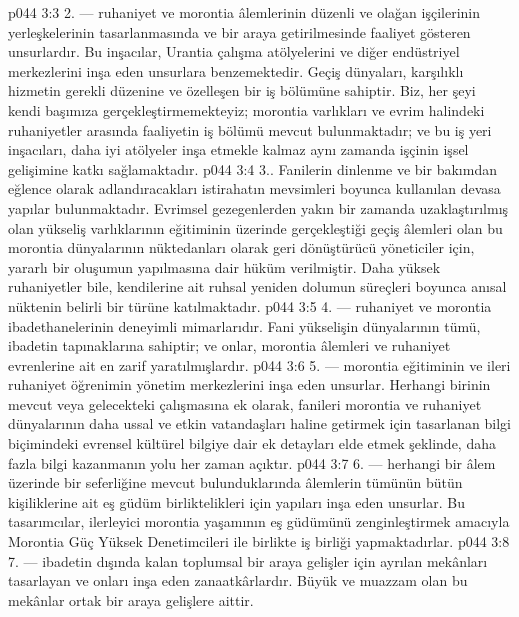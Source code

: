 \vs p044 3:3 2.\bibnobreakspace {} --- ruhaniyet ve morontia âlemlerinin düzenli ve olağan işçilerinin yerleşkelerinin tasarlanmasında ve bir araya getirilmesinde faaliyet gösteren unsurlardır. Bu inşacılar, Urantia çalışma atölyelerini ve diğer endüstriyel merkezlerini inşa eden unsurlara benzemektedir. Geçiş dünyaları, karşılıklı hizmetin gerekli düzenine ve özelleşen bir iş bölümüne sahiptir. Biz, her şeyi kendi başımıza gerçekleştirmemekteyiz; morontia varlıkları ve evrim halindeki ruhaniyetler arasında faaliyetin iş bölümü mevcut bulunmaktadır; ve bu iş yeri inşacıları, daha iyi atölyeler inşa etmekle kalmaz aynı zamanda işçinin işsel gelişimine katkı sağlamaktadır.
\vs p044 3:4 3.\bibnobreakspace {}. Fanilerin dinlenme ve bir bakımdan eğlence olarak adlandıracakları istirahatın mevsimleri boyunca kullanılan devasa yapılar bulunmaktadır. Evrimsel gezegenlerden yakın bir zamanda uzaklaştırılmış olan yükseliş varlıklarının eğitiminin üzerinde gerçekleştiği geçiş âlemleri olan bu morontia dünyalarının nüktedanları olarak geri dönüştürücü yöneticiler için, yararlı bir oluşumun yapılmasına dair hüküm verilmiştir. Daha yüksek ruhaniyetler bile, kendilerine ait ruhsal yeniden dolumun süreçleri boyunca anısal nüktenin belirli bir türüne katılmaktadır.
\vs p044 3:5 4.\bibnobreakspace {} --- ruhaniyet ve morontia ibadethanelerinin deneyimli mimarlarıdır. Fani yükselişin dünyalarının tümü, ibadetin tapınaklarına sahiptir; ve onlar, morontia âlemleri ve ruhaniyet evrenlerine ait en zarif yaratılmışlardır.
\vs p044 3:6 5.\bibnobreakspace {} --- morontia eğitiminin ve ileri ruhaniyet öğrenimin yönetim merkezlerini inşa eden unsurlar. Herhangi birinin mevcut veya gelecekteki çalışmasına ek olarak, fanileri morontia ve ruhaniyet dünyalarının daha ussal ve etkin vatandaşları haline getirmek için tasarlanan bilgi biçimindeki evrensel kültürel bilgiye dair ek detayları elde etmek şeklinde, daha fazla bilgi kazanmanın yolu her zaman açıktır.
\vs p044 3:7 6.\bibnobreakspace {} --- herhangi bir âlem üzerinde bir seferliğine mevcut bulunduklarında âlemlerin tümünün bütün kişiliklerine ait eş güdüm birliktelikleri için yapıları inşa eden unsurlar. Bu tasarımcılar, ilerleyici morontia yaşamının eş güdümünü zenginleştirmek amacıyla Morontia Güç Yüksek Denetimcileri ile birlikte iş birliği yapmaktadırlar.
\vs p044 3:8 7.\bibnobreakspace {} --- ibadetin dışında kalan toplumsal bir araya gelişler için ayrılan mekânları tasarlayan ve onları inşa eden zanaatkârlardır. Büyük ve muazzam olan bu mekânlar ortak bir araya gelişlere aittir.
